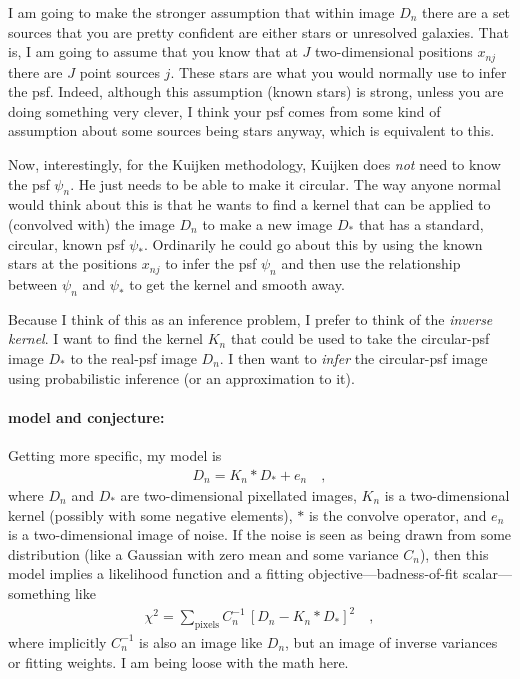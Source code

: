 \documentclass[12pt]{article}
\begin{document}
I am going to make the stronger assumption that within image $D_n$
there are a set sources that you are pretty confident are either stars
or unresolved galaxies.  That is, I am going to assume that you know
that at $J$ two-dimensional positions $x_{nj}$ there are $J$ point
sources $j$.  These stars are what you would normally use to infer the
psf.  Indeed, although this assumption (known stars) is strong, unless
you are doing something very clever, I think your psf comes from some
kind of assumption about some sources being stars anyway, which is
equivalent to this.

Now, interestingly, for the Kuijken methodology, Kuijken does
\emph{not} need to know the psf $\psi_n$.  He just needs to be able to
make it circular.  The way anyone normal would think about this is
that he wants to find a kernel that can be applied to (convolved with)
the image $D_n$ to make a new image $D_\ast$ that has a standard,
circular, known psf $\psi_\ast$.  Ordinarily he could go about this by
using the known stars at the positions $x_{nj}$ to infer the psf
$\psi_n$ and then use the relationship between $\psi_n$ and
$\psi_\ast$ to get the kernel and smooth away.

Because I think of this as an inference problem, I prefer to think of
the \emph{inverse kernel}.  I want to find the kernel $K_n$ that could
be used to take the circular-psf image $D_\ast$ to the real-psf image
$D_n$.  I then want to \emph{infer} the circular-psf image using
probabilistic inference (or an approximation to it).

\paragraph{model and conjecture:}
Getting more specific, my model is
\begin{eqnarray}\displaystyle
D_n = K_n \ast D_\ast + e_n \quad,
\end{eqnarray}
where $D_n$ and $D_\ast$ are two-dimensional pixellated images, $K_n$
is a two-di\-men\-sion\-al kernel (possibly with some negative elements),
$\ast$ is the convolve operator, and $e_n$ is a two-dimensional image
of noise.  If the noise is seen as being drawn from some distribution
(like a Gaussian with zero mean and some variance $C_n$), then this
model implies a likelihood function and a fitting
objective---badness-of-fit scalar---something like
\begin{eqnarray}\displaystyle
\chi^2 = \sum_{\mathrm{pixels}} C_n^{-1}\,[D_n - K_n \ast D_\ast]^2 \quad,
\end{eqnarray}
where implicitly $C_n^{-1}$ is also an image like $D_n$, but an image of inverse variances or fitting weights.  I am being loose
with the math here.
\end{document}

